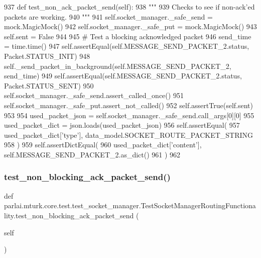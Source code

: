 \begin{DoxyCode}
937     \textcolor{keyword}{def }test\_non\_ack\_packet\_send(self):
938         \textcolor{stringliteral}{"""}
939 \textcolor{stringliteral}{        Checks to see if non-ack'ed packets are working.}
940 \textcolor{stringliteral}{        """}
941         self.socket\_manager.\_safe\_send = mock.MagicMock()
942         self.socket\_manager.\_safe\_put = mock.MagicMock()
943         self.sent = \textcolor{keyword}{False}
944 
945         \textcolor{comment}{# Test a blocking acknowledged packet}
946         send\_time = time.time()
947         self.assertEqual(self.MESSAGE\_SEND\_PACKET\_2.status, Packet.STATUS\_INIT)
948         self.\_send\_packet\_in\_background(self.MESSAGE\_SEND\_PACKET\_2, send\_time)
949         self.assertEqual(self.MESSAGE\_SEND\_PACKET\_2.status, Packet.STATUS\_SENT)
950         self.socket\_manager.\_safe\_send.assert\_called\_once()
951         self.socket\_manager.\_safe\_put.assert\_not\_called()
952         self.assertTrue(self.sent)
953 
954         used\_packet\_json = self.socket\_manager.\_safe\_send.call\_args[0][0]
955         used\_packet\_dict = json.loads(used\_packet\_json)
956         self.assertEqual(
957             used\_packet\_dict[\textcolor{stringliteral}{'type'}], data\_model.SOCKET\_ROUTE\_PACKET\_STRING
958         )
959         self.assertDictEqual(
960             used\_packet\_dict[\textcolor{stringliteral}{'content'}], self.MESSAGE\_SEND\_PACKET\_2.as\_dict()
961         )
962 
\end{DoxyCode}
\mbox{\label{classparlai_1_1mturk_1_1core_1_1test_1_1test__socket__manager_1_1TestSocketManagerRoutingFunctionality_ad666606ce8b73662ccd3f5c5cbbc611b}} 
\subsubsection{\texorpdfstring{test\+\_\+non\+\_\+blocking\+\_\+ack\+\_\+packet\+\_\+send()}{test\_non\_blocking\_ack\_packet\_send()}}
{\footnotesize\ttfamily def parlai.\+mturk.\+core.\+test.\+test\+\_\+socket\+\_\+manager.\+Test\+Socket\+Manager\+Routing\+Functionality.\+test\+\_\+non\+\_\+blocking\+\_\+ack\+\_\+packet\+\_\+send (\begin{DoxyParamCaption}\item[{}]{self }\end{DoxyParamCaption})}

